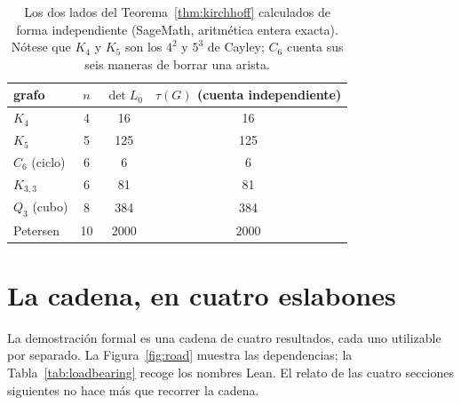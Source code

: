 \documentclass[11pt]{article}
\begin{document}
\begin{table}[h]
\centering
{}
\begin{tabular}{lccc}
\toprule
\rowcolor{ggteal!18} grafo & $n$ & $\det L_0$ & $\tau(G)$ (cuenta independiente) \\
\midrule
$K_4$          & 4  & 16   & 16   \\
$K_5$          & 5  & 125  & 125  \\
$C_6$ (ciclo)  & 6  & 6    & 6    \\
$K_{3,3}$      & 6  & 81   & 81   \\
$Q_3$ (cubo)   & 8  & 384  & 384  \\
Petersen       & 10 & 2000 & 2000 \\
\bottomrule
\end{tabular}
\caption{Los dos lados del Teorema~\ref{thm:kirchhoff} calculados de forma independiente
(SageMath, aritm\'etica entera exacta). N\'otese que $K_4$ y $K_5$ son los $4^{2}$ y $5^{3}$ de
Cayley; $C_6$ cuenta sus seis maneras de borrar una arista.}
\label{tab:numbers}
\end{table}

\section{La cadena, en cuatro eslabones}
\label{sec:chain}

La demostraci\'on formal es una cadena de cuatro resultados, cada uno utilizable por separado.
La Figura~\ref{fig:road} muestra las dependencias; la Tabla~\ref{tab:loadbearing} recoge los
nombres Lean. El relato de las cuatro secciones siguientes no hace m\'as que recorrer la cadena.
\end{document}

